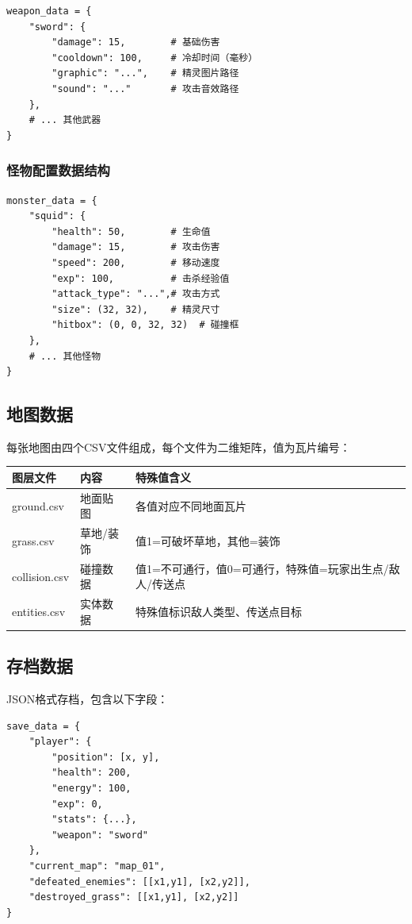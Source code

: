 \documentclass[12pt,a4paper]{article}
\begin{document}
\begin{verbatim}
weapon_data = {
    "sword": {
        "damage": 15,        # 基础伤害
        "cooldown": 100,     # 冷却时间（毫秒）
        "graphic": "...",    # 精灵图片路径
        "sound": "..."       # 攻击音效路径
    },
    # ... 其他武器
}
\end{verbatim}

\subsubsection{怪物配置数据结构}

\begin{verbatim}
monster_data = {
    "squid": {
        "health": 50,        # 生命值
        "damage": 15,        # 攻击伤害
        "speed": 200,        # 移动速度
        "exp": 100,          # 击杀经验值
        "attack_type": "...",# 攻击方式
        "size": (32, 32),    # 精灵尺寸
        "hitbox": (0, 0, 32, 32)  # 碰撞框
    },
    # ... 其他怪物
}
\end{verbatim}

\subsection{地图数据}

每张地图由四个CSV文件组成，每个文件为二维矩阵，值为瓦片编号：

\begin{table}[htbp]
\centering
\begin{tabularx}{\textwidth}{lXX}
\toprule
\textbf{图层文件} & \textbf{内容} & \textbf{特殊值含义} \\
\midrule
ground.csv & 地面贴图 & 各值对应不同地面瓦片 \\
grass.csv & 草地/装饰 & 值1=可破坏草地，其他=装饰 \\
collision.csv & 碰撞数据 & 值1=不可通行，值0=可通行，特殊值=玩家出生点/敌人/传送点 \\
entities.csv & 实体数据 & 特殊值标识敌人类型、传送点目标 \\
\bottomrule
\end{tabularx}
\end{table}

\subsection{存档数据}

JSON格式存档，包含以下字段：

\begin{verbatim}
save_data = {
    "player": {
        "position": [x, y],
        "health": 200,
        "energy": 100,
        "exp": 0,
        "stats": {...},
        "weapon": "sword"
    },
    "current_map": "map_01",
    "defeated_enemies": [[x1,y1], [x2,y2]],
    "destroyed_grass": [[x1,y1], [x2,y2]]
}
\end{verbatim}
\end{document}
